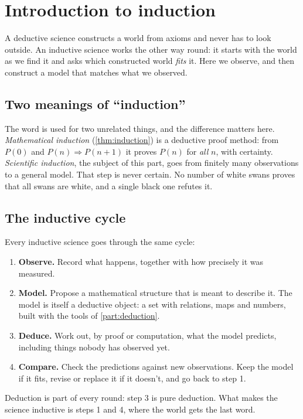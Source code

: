 \chapter*{Introduction to induction}
\label{intro:induction}

A deductive science constructs a world from axioms and never has to look outside.
An inductive science works the other way round: it starts with the world as we
find it and asks which constructed world \emph{fits} it. Here we observe, and then
construct a model that matches what we observed.

\section*{Two meanings of \enquote{induction}}

The word is used for two unrelated things, and the difference matters here.
\emph{Mathematical induction} (\cref{thm:induction}) is a deductive proof method:
from $P(0)$ and $P(n) \Rightarrow P(n+1)$ it proves $P(n)$ for \emph{all} $n$,
with certainty. \emph{Scientific induction}, the subject of this part, goes from
finitely many observations to a general model. That step is never certain. No
number of white swans proves that all swans are white, and a single black one
refutes it.

\section*{The inductive cycle}

Every inductive science goes through the same cycle:
\begin{enumerate}
  \item \textbf{Observe.} Record what happens, together with how precisely it was
    measured.
  \item \textbf{Model.} Propose a mathematical structure that is meant to describe
    it. The model is itself a deductive object: a set with relations, maps and
    numbers, built with the tools of \cref{part:deduction}.
  \item \textbf{Deduce.} Work out, by proof or computation, what the model
    predicts, including things nobody has observed yet.
  \item \textbf{Compare.} Check the predictions against new observations. Keep the
    model if it fits, revise or replace it if it doesn't, and go back to step 1.
\end{enumerate}
Deduction is part of every round: step 3 is pure deduction. What makes the
science inductive is steps 1 and 4, where the world gets the last word.

